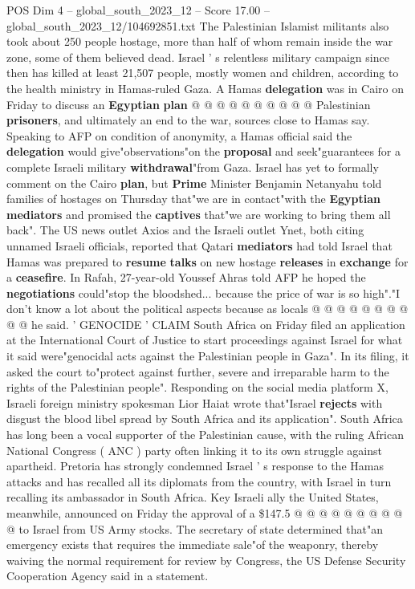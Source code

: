 \begin{textsample}{POS Dim 4 – global\_south\_2023\_12 – Score 17.00 – global\_south\_2023\_12/104692851.txt}
The Palestinian Islamist militants also took about 250 people hostage, more than half of whom remain inside the war zone, some of them believed dead.
Israel ' s relentless military campaign since then has killed at least 21,507 people, mostly women and children, according to the health ministry in Hamas-ruled Gaza.
A Hamas \textbf{delegation} was in Cairo on Friday to discuss an \textbf{Egyptian} \textbf{plan} @ @ @ @ @ @ @ @ @ @ Palestinian \textbf{prisoners}, and ultimately an end to the war, sources close to Hamas say.
Speaking to AFP on condition of anonymity, a Hamas official said the \textbf{delegation} would give"observations"on the \textbf{proposal} and seek"guarantees for a complete Israeli military \textbf{withdrawal}"from Gaza.
Israel has yet to formally comment on the Cairo \textbf{plan}, but \textbf{Prime} Minister Benjamin Netanyahu told families of hostages on Thursday that"we are in contact"with the \textbf{Egyptian} \textbf{mediators} and promised the \textbf{captives} that"we are working to bring them all back".
The US news outlet Axios and the Israeli outlet Ynet, both citing unnamed Israeli officials, reported that Qatari \textbf{mediators} had told Israel that Hamas was prepared to \textbf{resume} \textbf{talks} on new hostage \textbf{releases} in \textbf{exchange} for a \textbf{ceasefire}.
In Rafah, 27-year-old Youssef Ahras told AFP he hoped the \textbf{negotiations} could"stop the bloodshed... because the price of war is so high"."I don't know a lot about the political aspects because as locals @ @ @ @ @ @ @ @ @ @ he said. ' GENOCIDE ' CLAIM South Africa on Friday filed an application at the International Court of Justice to start proceedings against Israel for what it said were"genocidal acts against the Palestinian people in Gaza".
In its filing, it asked the court to"protect against further, severe and irreparable harm to the rights of the Palestinian people".
Responding on the social media platform X, Israeli foreign ministry spokesman Lior Haiat wrote that"Israel \textbf{rejects} with disgust the blood libel spread by South Africa and its application".
South Africa has long been a vocal supporter of the Palestinian cause, with the ruling African National Congress ( ANC ) party often linking it to its own struggle against apartheid.
Pretoria has strongly condemned Israel ' s response to the Hamas attacks and has recalled all its diplomats from the country, with Israel in turn recalling its ambassador in South Africa.
Key Israeli ally the United States, meanwhile, announced on Friday the approval of a \$147.5 @ @ @ @ @ @ @ @ @ @ to Israel from US Army stocks.
The secretary of state determined that"an emergency exists that requires the immediate sale"of the weaponry, thereby waiving the normal requirement for review by Congress, the US Defense Security Cooperation Agency said in a statement.

\end{textsample}
